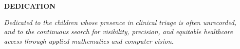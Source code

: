 \begin{center}
    {\bfseries\Large DEDICATION}
\end{center}
\vspace{0.8cm}

\begin{center}
    \textit{Dedicated to the children whose presence in clinical triage is often unrecorded, and to the continuous search for visibility, precision, and equitable healthcare access through applied mathematics and computer vision.}
\end{center}